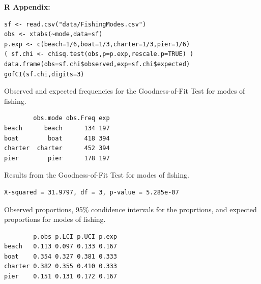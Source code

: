 \documentclass[10pt,openany]{book}\usepackage[]{graphicx}\usepackage[]{color}
\makeatletter
\newenvironment{kframe}{%
 \def\at@end@of@kframe{}%
 \ifinner\ifhmode%
  \def\at@end@of@kframe{\end{minipage}}%
  \begin{minipage}{\columnwidth}%
 \fi\fi%
 \def\FrameCommand##1{\hskip\@totalleftmargin \hskip-\fboxsep
 \colorbox{shadecolor}{##1}\hskip-\fboxsep
     \hskip-\linewidth \hskip-\@totalleftmargin \hskip\columnwidth}%
 \MakeFramed {\advance\hsize-\width
   \@totalleftmargin\z@ \linewidth\hsize
   \@setminipage}}%
 {\par\unskip\endMakeFramed%
 \at@end@of@kframe}
\newenvironment{knitrout}{}{} %
\makeatother
\begin{document}
\begin{minipage}{\textwidth}
\textbf{R Appendix:}
\begin{knitrout}
\color{fgcolor}\begin{kframe}
\begin{verbatim}
sf <- read.csv("data/FishingModes.csv")
obs <- xtabs(~mode,data=sf)
p.exp <- c(beach=1/6,boat=1/3,charter=1/3,pier=1/6)
( sf.chi <- chisq.test(obs,p=p.exp,rescale.p=TRUE) )
data.frame(obs=sf.chi$observed,exp=sf.chi$expected)
gofCI(sf.chi,digits=3)
\end{verbatim}
\end{kframe}
\end{knitrout}
\end{minipage}

\begin{table}[h]
  \caption{Observed and expected frequencies for the Goodness-of-Fit Test for modes of fishing.}
  \label{tab:GOFfishRes}
  \vspace{-12pt}
\begin{knitrout}
\color{fgcolor}\begin{kframe}
\begin{verbatim}
        obs.mode obs.Freq exp
beach      beach      134 197
boat        boat      418 394
charter  charter      452 394
pier        pier      178 197
\end{verbatim}
\end{kframe}
\end{knitrout}
\end{table}

\begin{table}[h]
  \caption{Results from the Goodness-of-Fit Test for modes of fishing.}
  \label{tab:GOFfishChi}
  \vspace{-12pt}
\begin{knitrout}
\color{fgcolor}\begin{kframe}
\begin{verbatim}
X-squared = 31.9797, df = 3, p-value = 5.285e-07
\end{verbatim}
\end{kframe}
\end{knitrout}
\end{table}

\begin{table}[h]
  \caption{Observed proportions, 95\% condidence intervals for the proprtions, and expected proportions for modes of fishing.}
  \label{tab:GOFfishCIs}
  \vspace{-12pt}
\begin{knitrout}
\color{fgcolor}\begin{kframe}
\begin{verbatim}
        p.obs p.LCI p.UCI p.exp
beach   0.113 0.097 0.133 0.167
boat    0.354 0.327 0.381 0.333
charter 0.382 0.355 0.410 0.333
pier    0.151 0.131 0.172 0.167
\end{verbatim}
\end{kframe}
\end{knitrout}
\end{table}
\end{document}

